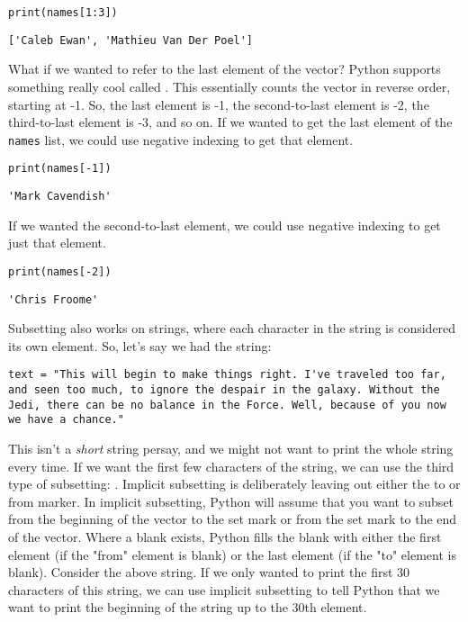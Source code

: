 \begin{lstlisting}[style=pippython]
print(names[1:3])
\end{lstlisting}
\begin{lstlisting}[style=none]
['Caleb Ewan', 'Mathieu Van Der Poel']
\end{lstlisting}
What if we wanted to refer to the last element of the vector? Python supports something really cool called . This essentially counts the vector in reverse order, starting at -1. So, the last element is -1, the second-to-last element is -2, the third-to-last element is -3, and so on. If we wanted to get the last element of the \verb|names| list, we could use negative indexing to get that element.
\begin{lstlisting}[style=pippython]
print(names[-1])
\end{lstlisting}
\begin{lstlisting}[style=none]
'Mark Cavendish'
\end{lstlisting}
If we wanted the second-to-last element, we could use negative indexing to get just that element.\par
\begin{lstlisting}[style=pippython]
print(names[-2])
\end{lstlisting}
\begin{lstlisting}[style=none]
'Chris Froome'
\end{lstlisting}
Subsetting also works on strings, where each character in the string is considered its own element. So, let's say we had the string:
\begin{lstlisting}[style=pippython]
text = "This will begin to make things right. I've traveled too far, and seen too much, to ignore the despair in the galaxy. Without the Jedi, there can be no balance in the Force. Well, because of you now we have a chance."
\end{lstlisting}
This isn't a \textit{short} string persay, and we might not want to print the whole string every time. If we want the first few characters of the string, we can use the third type of subsetting: . Implicit subsetting is deliberately leaving out either the to or from marker. In implicit subsetting, Python will assume that you want to subset from the beginning of the vector to the set mark or from the set mark to the end of the vector. Where a blank exists, Python fills the blank with either the first element (if the "from" element is blank) or the last element (if the "to" element is blank). Consider the above string. If we only wanted to print the first 30 characters of this string, we can use implicit subsetting to tell Python that we want to print the beginning of the string up to the 30th element.\par
